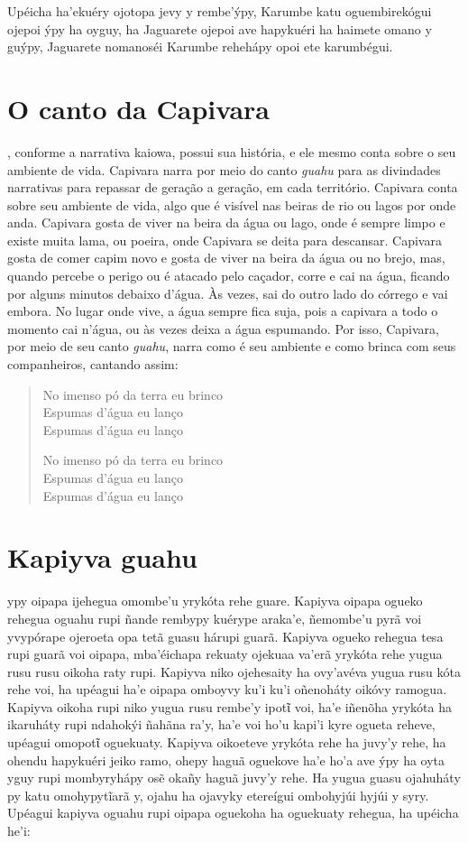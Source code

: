 Upéicha ha'ekuéry ojotopa jevy y rembe'ýpy, Karumbe katu oguembirekógui 
ojepoi ýpy ha oyguy, ha Jaguarete ojepoi ave hapykuéri ha haimete omano
y guýpy, Jaguarete nomanoséi Karumbe rehehápy opoi ete karumbégui.

\chapter{O canto da Capivara}

, conforme a narrativa kaiowa, possui sua história, e ele mesmo
conta sobre o seu ambiente de vida. Capivara narra por meio do canto
\textit{guahu} para as divindades narrativas para repassar de geração a
geração, em cada território. Capivara conta sobre seu ambiente de vida,
algo que é visível nas beiras de rio ou lagos por onde anda. Capivara
gosta de viver na beira da água ou lago, onde é sempre limpo e existe
muita lama, ou poeira, onde Capivara se deita para descansar. Capivara
gosta de comer capim novo e gosta de viver na beira da água ou no brejo,
mas, quando percebe o perigo ou é atacado pelo caçador, corre e cai na
água, ficando por alguns minutos debaixo d'água. Às vezes, sai do outro
lado do córrego e vai embora. No lugar onde vive, a água sempre fica
suja, pois a capivara a todo o momento cai n'água, ou às vezes deixa a
água espumando. Por isso, Capivara, por meio de seu canto \textit{guahu},
narra como é seu ambiente e como brinca com seus companheiros, cantando
assim:

\begin{verse}
No imenso pó da terra eu brinco\\
Espumas d'água eu lanço\\
Espumas d'água eu lanço

No imenso pó da terra eu brinco\\
Espumas d'água eu lanço\\
Espumas d'água eu lanço
\end{verse}

\chapter{Kapiyva guahu}

 ypy oipapa ijehegua omombe'u yrykóta rehe guare. Kapiyva oipapa
ogueko rehegua oguahu rupi ñande rembypy kuérype araka'e, ñemombe'u pyrã
voi yvypórape ojeroeta opa tetã guasu hárupi guarã. Kapiyva ogueko
rehegua tesa rupi guarã voi oipapa, mba'éichapa rekuaty ojekuaa va'erã
yrykóta rehe yugua rusu rusu oikoha raty rupi. Kapiyva niko ojehesaity
ha ovy'avéva yugua rusu kóta rehe voi, ha upéagui ha'e oipapa omboyvy
ku'i ku'i oñenoháty oikóvy ramogua. Kapiyva oikoha rupi niko yugua rusu
rembe'y ipotῖ voi, ha'e iñenõha yrykóta ha ikaruháty rupi ndahokýi
ñahãna ra'y, ha'e voi ho'u kapi'i kyre ogueta reheve, upéagui omopotῖ
oguekuaty. Kapiyva oikoeteve yrykóta rehe ha juvy'y rehe, ha ohendu
hapykuéri jeiko ramo, ohepy haguã oguekove ha'e ho'a ave ýpy ha oyta
yguy rupi mombyryhápy osẽ okañy haguã juvy'y rehe. Ha yugua guasu
ojahuháty py katu omohypytĩarã y, ojahu ha ojavyky etereígui ombohyjúi
hyjúi y syry. Upéagui kapiyva oguahu rupi oipapa oguekoha ha oguekuaty
rehegua, ha upéicha he'i:

